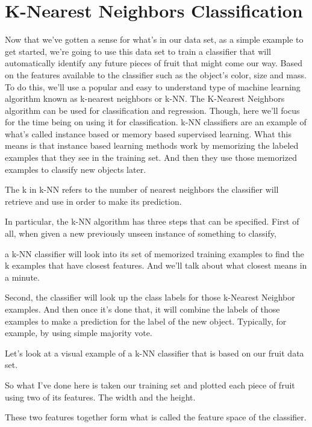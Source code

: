 \section{K-Nearest Neighbors Classification}
\begin{multicols}{2}

Now that we've gotten a sense for what's in our data set, as a simple example to get started, we're going to use this data set to train a classifier that will automatically identify any future pieces of fruit that might come our way. Based on the features available to the classifier such as the object's color, size and mass. To do this, we'll use a popular and easy to understand type of machine learning algorithm known as k-nearest neighbors or k-NN. The K-Nearest Neighbors algorithm can be used for classification and regression. Though, here we'll focus for the time being on using it for classification. k-NN classifiers are an example of what's called instance based or memory based supervised learning. What this means is that instance based learning methods work by memorizing the labeled examples that they see in the training set. And then they use those memorized examples to classify new objects later. 

The k in k-NN refers to the number of nearest neighbors the classifier will retrieve and use in order to make its prediction. 

In particular, the k-NN algorithm has three steps that can be specified. First of all, when given a new previously unseen instance of something to classify, 

a k-NN classifier will look into its set of memorized training examples to find the k examples that have closest features. And we'll talk about what closest means in a minute. 

Second, the classifier will look up the class labels for those k-Nearest Neighbor examples. And then once it's done that, it will combine the labels of those examples to make a prediction for the label of the new object. Typically, for example, by using simple majority vote. 

Let's look at a visual example of a k-NN classifier that is based on our fruit data set. 

So what I've done here is taken our training set and plotted each piece of fruit using two of its features. The width and the height. 

These two features together form what is called the feature space of the classifier. 


\end{multicols}
